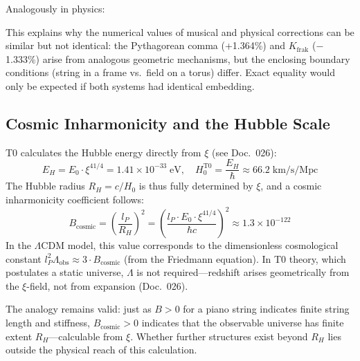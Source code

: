 Analogously in physics:
\begin{center}
\end{center}

This explains why the numerical values of musical and physical corrections can be similar but not identical: the Pythagorean comma (+1.364\%) and $K_\text{frak}$ ($-$1.333\%) arise from analogous geometric mechanisms, but the enclosing boundary conditions (string in a frame vs.\ field on a torus) differ. Exact equality would only be expected if both systems had identical embedding.

\subsection{Cosmic Inharmonicity and the Hubble Scale}

T0 calculates the Hubble energy directly from $\xi$ (see Doc.~026):
\begin{equation}
	E_H = E_0 \cdot \xi^{41/4} = 1.41 \times 10^{-33}\;\text{eV}, \quad H_0^{\text{T0}} = \frac{E_H}{\hbar} \approx 66.2\;\text{km/s/Mpc}
\end{equation}
The Hubble radius $R_H = c/H_0$ is thus fully determined by $\xi$, and a cosmic inharmonicity coefficient follows:
\begin{equation}
	B_\text{cosmic} = \left(\frac{l_P}{R_H}\right)^2 = \left(\frac{l_P \cdot E_0 \cdot \xi^{41/4}}{\hbar c}\right)^2 \approx 1.3 \times 10^{-122}
\end{equation}
In the $\Lambda$CDM model, this value corresponds to the dimensionless cosmological constant $l_P^2 \Lambda_\text{obs} \approx 3 \cdot B_\text{cosmic}$ (from the Friedmann equation). In T0 theory, which postulates a static universe, $\Lambda$ is not required---redshift arises geometrically from the $\xi$-field, not from expansion (Doc.~026).

The analogy remains valid: just as $B > 0$ for a piano string indicates finite string length and stiffness, $B_\text{cosmic} > 0$ indicates that the observable universe has finite extent $R_H$---calculable from $\xi$. Whether further structures exist beyond $R_H$ lies outside the physical reach of this calculation.

